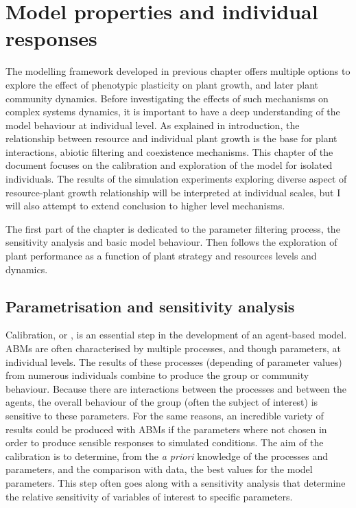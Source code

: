 
\chapter{Model properties and individual responses}

The modelling framework developed in previous chapter offers multiple options to explore the effect of phenotypic plasticity on plant growth, and later plant community dynamics. Before investigating the effects of such mechanisms on complex systems dynamics, it is important to have a deep understanding of the model behaviour at individual level. As explained in introduction, the relationship between resource and individual plant growth is the base for plant interactions, abiotic filtering and coexistence mechanisms. This chapter of the document focuses on the calibration and exploration of the model for isolated individuals. The results of the simulation experiments exploring diverse aspect of resource-plant growth relationship will be interpreted at individual scales, but I will also attempt to extend conclusion to higher level mechanisms.

The first part of the chapter is dedicated to the parameter filtering process, the sensitivity analysis and basic model behaviour. Then follows the exploration of plant performance as a function of plant strategy and resources levels and dynamics.


\section{Parametrisation and sensitivity analysis} \label{section:calibration}

Calibration, or , is an essential step in the development of an agent-based model. ABMs are often characterised by multiple processes, and though parameters, at individual levels. The results of these processes (depending of parameter values) from numerous individuals combine to produce the group or community behaviour. Because there are interactions between the processes and between the agents, the overall behaviour of the group (often the subject of interest) is sensitive to these parameters. For the same reasons, an incredible variety of results could be produced with ABMs if the parameters where not chosen in order to produce sensible responses to simulated conditions. The aim of the calibration is to determine, from the \textit{a priori} knowledge of the processes and parameters, and the comparison with data, the best values for the model parameters. This step often goes along with a sensitivity analysis that determine the relative sensitivity of variables of interest to specific parameters.


